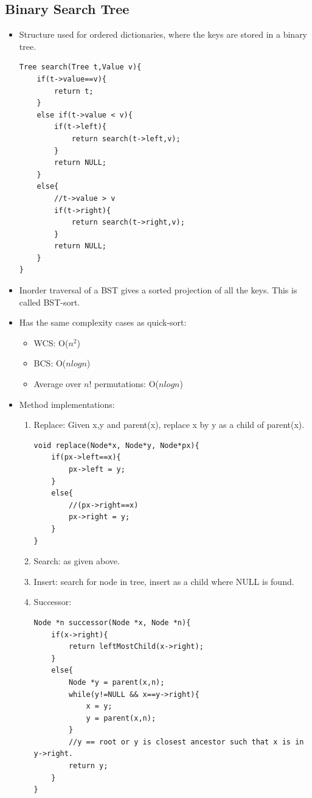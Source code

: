 \documentclass{report}
\begin{document}
\subsection{Binary Search Tree}
\begin{itemize}
\item Structure used for ordered dictionaries, where the keys are stored
in a binary tree.
\begin{lstlisting}
Tree search(Tree t,Value v){
    if(t->value==v){
        return t;
    }
    else if(t->value < v){
        if(t->left){
            return search(t->left,v);
        }
        return NULL;
    }
    else{
        //t->value > v
        if(t->right){
            return search(t->right,v);
        }
        return NULL;
    }
}
\end{lstlisting}
\item Inorder traversal of a BST gives a sorted projection of all the keys. This is called BST-sort.
\item Has the same complexity cases as quick-sort:
\begin{itemize}
    \item WCS: O($n^2$)
    \item BCS: O($nlogn$)
    \item Average over $n!$ permutations: O($nlogn$)
\end{itemize}
\item Method implementations:
\begin{enumerate}
\item Replace: Given x,y and parent(x), replace x by y as a child of parent(x).
\begin{lstlisting}
void replace(Node*x, Node*y, Node*px){
    if(px->left==x){
        px->left = y;
    }
    else{
        //(px->right==x)
        px->right = y;
    }
}
\end{lstlisting}
\item Search: as given above.
\item Insert: search for node in tree, insert as a child where NULL is found.
\item Successor:
\begin{lstlisting}
Node *n successor(Node *x, Node *n){
    if(x->right){
        return leftMostChild(x->right);
    }
    else{
        Node *y = parent(x,n);
        while(y!=NULL && x==y->right){
            x = y;
            y = parent(x,n);
        }
        //y == root or y is closest ancestor such that x is in y->right.
        return y;
    }
}
\end{lstlisting}

\end{enumerate}
\end{itemize}
\end{document}
